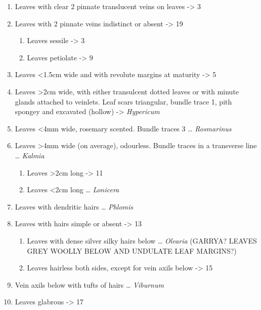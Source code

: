 \documentclass[openany]{book}
\providecommand{\tightlist}{%
  \setlength{\itemsep}{0pt}\setlength{\parskip}{0pt}}
\begin{document}
\begin{enumerate}
\def\labelenumi{\arabic{enumi}.}
\tightlist
\item
  Leaves with clear 2 pinnate translucent veins on leaves
  -\textgreater{} 3
\item
  Leaves with 2 pinnate veins indistinct or absent -\textgreater{} 19

  \begin{enumerate}
  \def\labelenumii{\arabic{enumii}.}
  \setcounter{enumii}{2}
  \tightlist
  \item
    Leaves sessile -\textgreater{} 3
  \item
    Leaves petiolate -\textgreater{} 9
  \end{enumerate}
\item
  Leaves \textless{}1.5cm wide and with revolute margins at maturity
  -\textgreater{} 5
\item
  Leaves \textgreater{}2cm wide, with either transulcent dotted leaves
  or with minute glands attached to veinlets. Leaf scars triangular,
  bundle trace 1, pith spongey and excavated (hollow) -\textgreater{}
  \emph{Hypericum}
\item
  Leaves \textless{}4mm wide, rosemary scented. Bundle traces 3 \ldots{}
  \emph{Rosmarinus}
\item
  Leaves \textgreater{}4mm wide (on average), odourless. Bundle traces
  in a transverse line \ldots{} \emph{Kalmia}

  \begin{enumerate}
  \def\labelenumii{\arabic{enumii}.}
  \setcounter{enumii}{8}
  \tightlist
  \item
    Leaves \textgreater{}2cm long -\textgreater{} 11
  \item
    Leaves \textless{}2cm long \ldots{} \emph{Lonicera}
  \end{enumerate}
\item
  Leaves with dendritic hairs \ldots{} \emph{Phlomis}
\item
  Leaves with hairs simple or absent -\textgreater{} 13

  \begin{enumerate}
  \def\labelenumii{\arabic{enumii}.}
  \setcounter{enumii}{12}
  \tightlist
  \item
    Leaves with dense silver silky hairs below \ldots{} \emph{Olearia}
    (GARRYA? LEAVES GREY WOOLLY BELOW AND UNDULATE LEAF MARGINS?)
  \item
    Leaves hairless both sides, except for vein axils below
    -\textgreater{} 15
  \end{enumerate}
\item
  Vein axils below with tufts of hairs \ldots{} \emph{Viburnum}
\item
  Leaves glabrous -\textgreater{} 17


\end{enumerate}
\end{document}
